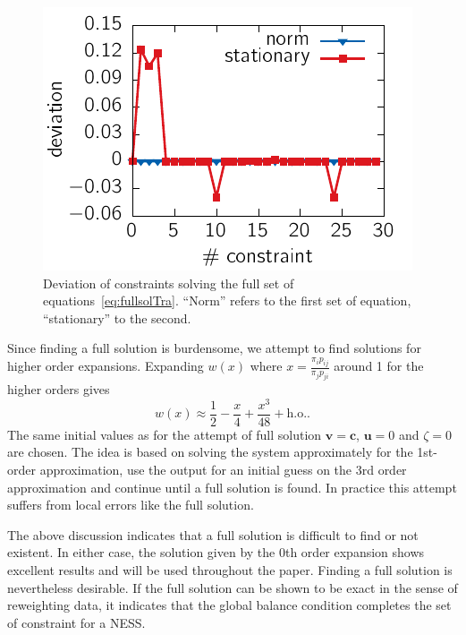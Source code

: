  \begin{figure}[t]
 \centering
 \includegraphics{../plots/Jaynes/fullsol.pdf}
 \caption[Deviation of constraints when attempting to find a full solution to the Caliber maximisation by numerical minimisation.]{Deviation of constraints solving the full set of equations~\ref{eq:fullsolTra}. \enquote{Norm} refers to the first set of equation, \enquote{stationary} to the second.  }
 \label{fig:fullsol}
\end{figure}


Since finding a full solution is burdensome, we attempt to find solutions for higher order expansions. Expanding $w(x)$ where $x=\frac{\pi_i p_{ij}}{\pi_j p_{ji}} $ around 1 for the higher orders gives
\begin{equation}
 w(x) \approx \frac{1}{2} - \frac{x}{4} +\frac{x^3}{48} + \text{h.o.}.
\end{equation}
The same initial values as for the attempt of full solution $\bm{v}= \bm{c}$, $\bm{u}=0$ and $\zeta =0$ are chosen. The idea is based on solving the system approximately for the 1st-order approximation, use the output for an initial guess on the 3rd order approximation and continue until a full solution is found. In practice this attempt suffers from local errors like the full solution. 

The above discussion indicates that a full solution is difficult to find or not existent. In either case, the solution given by the 0th order expansion shows excellent results and will be used throughout the paper. Finding a full solution is nevertheless desirable. If the full solution can be shown to be exact in the sense of reweighting data, it indicates that the global balance condition completes the set of constraint for a NESS.

%  
% 
% 
% 
% 
% 
% 
% 

















